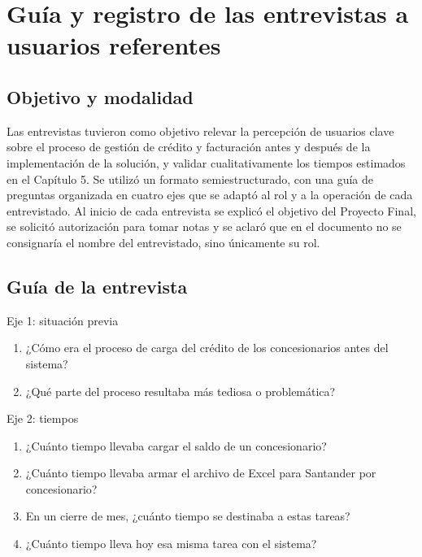 \chapter{Guía y registro de las entrevistas a usuarios referentes}\label{apx:entrevistas}

\section{Objetivo y modalidad}

Las entrevistas tuvieron como objetivo relevar la percepción de usuarios clave sobre el proceso de gestión de crédito y facturación antes y después de la implementación de la solución, y validar cualitativamente los tiempos estimados en el Capítulo 5. Se utilizó un formato semiestructurado, con una guía de preguntas organizada en cuatro ejes que se adaptó al rol y a la operación de cada entrevistado. Al inicio de cada entrevista se explicó el objetivo del Proyecto Final, se solicitó autorización para tomar notas y se aclaró que en el documento no se consignaría el nombre del entrevistado, sino únicamente su rol.

\section{Guía de la entrevista}

Eje 1: situación previa

\begin{enumerate}
\def\labelenumi{\arabic{enumi}.}
\item
  ¿Cómo era el proceso de carga del crédito de los concesionarios antes del sistema?
\item
  ¿Qué parte del proceso resultaba más tediosa o problemática?
\end{enumerate}

Eje 2: tiempos

\begin{enumerate}
\def\labelenumi{\arabic{enumi}.}
\setcounter{enumi}{2}
\item
  ¿Cuánto tiempo llevaba cargar el saldo de un concesionario?
\item
  ¿Cuánto tiempo llevaba armar el archivo de Excel para Santander por concesionario?
\item
  En un cierre de mes, ¿cuánto tiempo se destinaba a estas tareas?
\item
  ¿Cuánto tiempo lleva hoy esa misma tarea con el sistema?
\end{enumerate}


